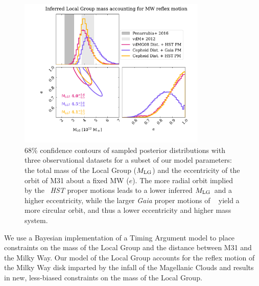 \documentclass[twocolumn]{aastex631}
\newcommand{\mlg}{\ensuremath{M_{\rm LG}}}
\begin{document}
\begin{figure}[htb]
  \centering
  \includegraphics[width=0.8\textwidth,trim=1.3cm 0.8cm 1.3cm 0cm,clip=true]
  {analyze-runs-contour.pdf}
  \caption{\label{fig:contour} 68\% confidence contours of sampled posterior
  distributions with three observational datasets for a subset of our model
  parameters: the total mass of the Local Group (\mlg)
  and the eccentricity of the orbit of M31 about a fixed MW ($e$).
  The more radial orbit implied by the~\cite{vdm2012} \textit{HST} proper
  motions leads to a lower inferred \mlg\ and a higher
  eccentricity, while the larger \textit{Gaia} proper motions of
  ~\cite{Salomon2021} yield a more circular orbit, and thus a lower eccentricity
   and higher mass system.
   }
\end{figure}


We use a Bayesian implementation of a Timing Argument model to place constraints
on the mass of the Local Group and the distance between M31 and the Milky Way.
Our model of the Local Group accounts for the reflex motion of the Milky Way
disk imparted by the infall of the Magellanic Clouds and results in new,
less-biased constraints on the mass of the Local Group.
\end{document}
